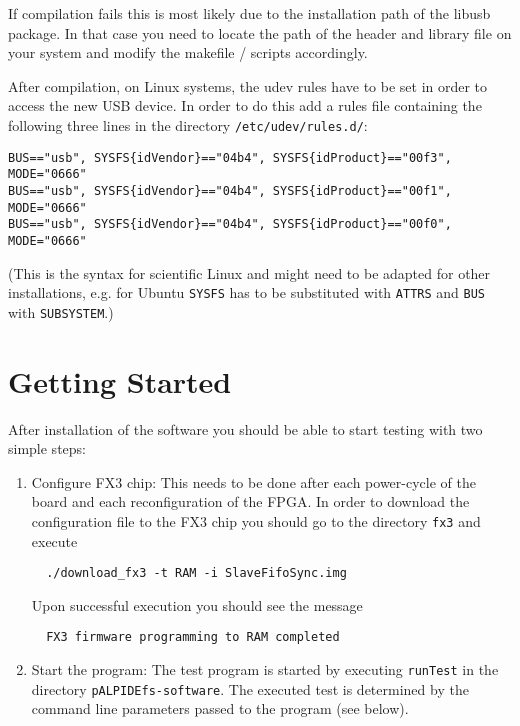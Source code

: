 \documentclass{article}
\let\oldsection\section
\renewcommand\section{\clearpage\oldsection}
\begin{document}
If compilation fails this is most likely due to the installation path
of the libusb package. In that case you need to locate the path of the
header and library file on your system and modify the makefile / scripts
accordingly. 

After compilation, on Linux systems, the udev rules have to be set in order to access the new USB device. In order to do this add a rules file containing the following three lines in the directory \texttt{/etc/udev/rules.d/}:

\begin{Verbatim}[fontsize=\small]
BUS=="usb", SYSFS{idVendor}=="04b4", SYSFS{idProduct}=="00f3", MODE="0666"
BUS=="usb", SYSFS{idVendor}=="04b4", SYSFS{idProduct}=="00f1", MODE="0666"
BUS=="usb", SYSFS{idVendor}=="04b4", SYSFS{idProduct}=="00f0", MODE="0666"
\end{Verbatim}

(This is the syntax for scientific Linux and might need to be adapted for other installations, e.g. for Ubuntu \texttt{SYSFS} has to be substituted with \texttt{ATTRS} and \texttt{BUS} with \texttt{SUBSYSTEM}.)

\section{Getting Started}

After installation of the software you should be able to start
testing with two simple steps:

\begin{enumerate}
\item{Configure FX3 chip: This needs to be done after each power-cycle
    of the board and each reconfiguration of the FPGA. In order to
    download the configuration file to the FX3 chip you should go to
    the directory \texttt{fx3} and
    execute 
   \begin{verbatim}
  ./download_fx3 -t RAM -i SlaveFifoSync.img
  \end{verbatim}
    Upon successful execution you should see the message 
    \begin{verbatim}
  FX3 firmware programming to RAM completed
  \end{verbatim}
}
\item{Start the program: The test program is started by executing
    \texttt{runTest} in the directory \texttt{pALPIDEfs-software}. The
    executed test is determined by the command line parameters passed
    to the program (see below).}
\end{enumerate}
\end{document}
